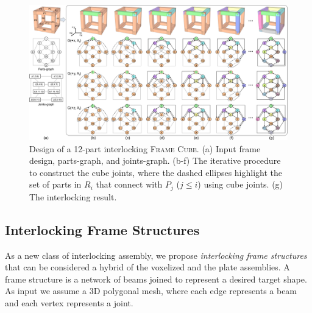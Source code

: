 \fi





  \begin{figure}[!t]
	\centering
	\includegraphics[width=17.75cm]{images/Application_Frame_Cube.png}
	\vspace*{-3.5mm}
	\caption{Design of a 12-part interlocking \textsc{Frame Cube}.
		(a) Input frame design, parts-graph, and joints-graph.
		(b-f) The iterative procedure to construct the cube joints, where the dashed ellipses highlight the set of parts in $R_i$ that connect with $P_j$ ($j\leq i$) using cube joints.
		(g) The interlocking result.}
	\vspace*{-2.0mm}
	\label{fig:Application_Frame_Cube}
\end{figure}



\subsection{Interlocking Frame Structures}
\label{subsec:frame}

As a new class of interlocking assembly, we propose  {\em interlocking frame structures} that can be considered a hybrid of the voxelized and the plate assemblies. A frame structure is a network of beams joined to represent a desired target shape. As input we assume a 3D polygonal mesh, where each edge represents a beam and each vertex represents a joint.

